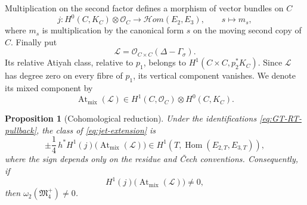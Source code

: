 \documentclass[11pt,a4paper,dvipsnames]{amsart}
\numberwithin{equation}{section}
\theoremstyle{plain}
\newtheorem{proposition}[theorem]{Proposition}
\theoremstyle{definition}
\newcommand{\cO}{\mathcal O}
\newcommand{\cL}{\mathcal L}
\newcommand{\M}{\mathfrak M}
\newcommand{\At}{\operatorname{At}}
\newcommand{\Hom}{\operatorname{Hom}}
\newcommand{\cHom}{\mathcal{H}om}
\begin{document}
Multiplication on the second factor defines a morphism of vector bundles
on $C$
\begin{equation}\label{eq:j}
 j:H^0(C,K_C)\otimes\cO_C\longrightarrow\cHom(E_2,E_3),
 \qquad
 s\longmapsto m_s,
\end{equation}
where $m_s$ is multiplication by the canonical form $s$ on the moving
second copy of $C$.  Finally put
\begin{equation}\label{eq:Lcal}
 \cL=\cO_{C\times C}(\Delta-\Gamma_\sigma).
\end{equation}
Its relative Atiyah class, relative to $p_1$, belongs to
$H^1(C\times C,p_2^*K_C)$.  Since $\cL$ has degree zero on every fibre of
$p_1$, its vertical component vanishes.  We denote its mixed component by
\begin{equation}\label{eq:Atmix-space}
 \At_{\mathrm{mix}}(\cL)
 \in H^1(C,\cO_C)\otimes H^0(C,K_C).
\end{equation}

\begin{proposition}[Cohomological reduction]
\label{prop:reduction}
Under the identifications \eqref{eq:GT-RT-pullback}, the class of
\eqref{eq:jet-extension} is
\begin{equation}\label{eq:pullback-key-class}
 \pm\frac14\,
 h^*H^1(j)\bigl(\At_{\mathrm{mix}}(\cL)\bigr)
 \in H^1\!\left(T,\Hom(E_{2,T},E_{3,T})\right),
\end{equation}
where the sign depends only on the residue and \v Cech conventions.
Consequently, if
\begin{equation}\label{eq:key-nonzero}
 H^1(j)\bigl(\At_{\mathrm{mix}}(\cL)\bigr)\neq0,
\end{equation}
then $\omega_2(\M_4^+)\neq0$.
\end{proposition}
\end{document}
